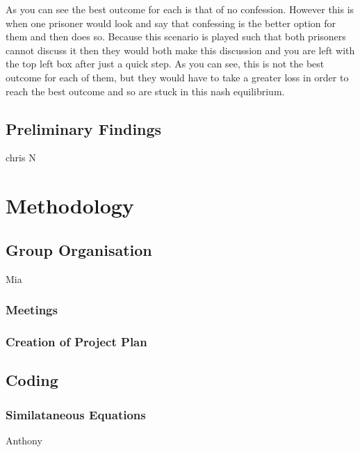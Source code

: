 \documentclass[a4paper,titlepage]{article}
\begin{document}
As you can see the best outcome for each is that of no confession. However this is when one prisoner would look and say that confessing is the better option for them and then does so. Because this scenario is played such that both prisoners cannot discuss it then they would both make this discussion and you are left with the top left box after just a quick step. As you can see, this is not the best outcome for each of them, but they would have to take a greater loss in order to reach the best outcome and so are stuck in this nash equilibrium.
\subsection{Preliminary Findings}
chris N


\section{Methodology}
\subsection{Group Organisation}
Mia
\subsubsection{Meetings}
\subsubsection{Creation of Project Plan}

\subsection{Coding}
\subsubsection{Similataneous Equations}

Anthony

\end{document}
